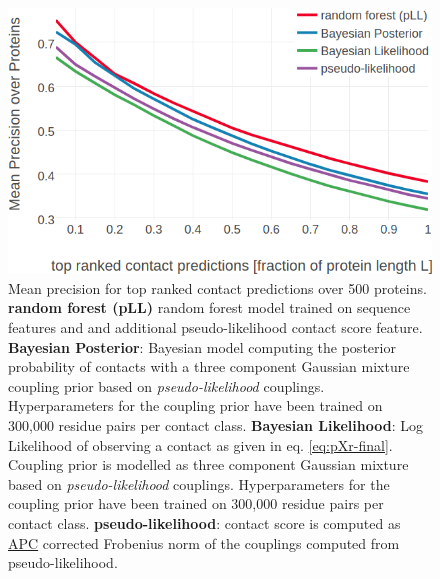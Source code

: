 \documentclass[11pt,a4paper,twoside]{book}
\theoremstyle{definition}
\theoremstyle{definition}
\theoremstyle{remark}
\begin{document}
\begin{figure}

{\centering \includegraphics[width=0.9\linewidth]{img/bayesian_model/benchmark/precision_vs_rank_pll_3comp_300k_likelihood} 

}

\caption{Mean precision
for top ranked contact predictions over 500 proteins. \textbf{random
forest (pLL)} random forest model trained on sequence features and and
additional pseudo-likelihood contact score feature. \textbf{Bayesian
Posterior}: Bayesian model computing the posterior probability of
contacts with a three component Gaussian mixture coupling prior based on
\emph{pseudo-likelihood} couplings. Hyperparameters for the coupling
prior have been trained on 300,000 residue pairs per contact class.
\textbf{Bayesian Likelihood}: Log Likelihood of observing a contact as
given in eq. \eqref{eq:pXr-final}. Coupling prior is modelled as three
component Gaussian mixture based on \emph{pseudo-likelihood} couplings.
Hyperparameters for the coupling prior have been trained on 300,000
residue pairs per contact class. \textbf{pseudo-likelihood}: contact
score is computed as \protect\hyperlink{abbrev}{APC} corrected Frobenius
norm of the couplings computed from pseudo-likelihood.}\label{fig:precision-bayesian-model-pll-3comp-300k-lik}
\end{figure}
\end{document}
